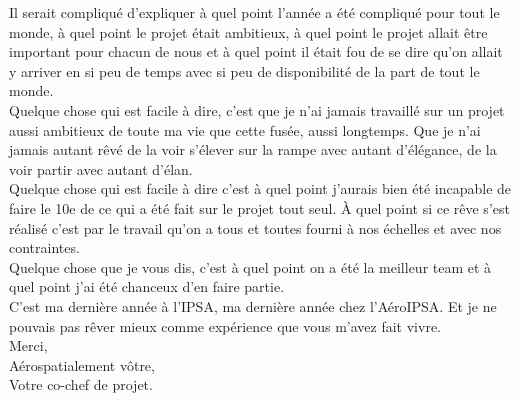 \documentclass{article}
\begin{document}
Il serait compliqué d'expliquer à quel point l'année a été compliqué pour tout le monde, à quel point le projet était
ambitieux, à quel point le projet allait être important pour chacun de nous et à quel point il était fou de se dire qu'on
allait y arriver en si peu de temps avec si peu de disponibilité de la part de tout le monde.\\

Quelque chose qui est facile à dire, c'est que je n'ai jamais travaillé sur un projet aussi ambitieux de toute ma vie que
cette fusée, aussi longtemps. Que je n'ai jamais autant rêvé de la voir s'élever sur la rampe avec autant d'élégance, de la
voir partir avec autant d'élan.\\

Quelque chose qui est facile à dire c'est à quel point j'aurais bien été incapable de faire le 10e de ce qui a été fait sur
le projet tout seul. À quel point si ce rêve s'est réalisé c'est par le travail qu'on a tous et toutes fourni à nos échelles
et avec nos contraintes.\\

Quelque chose que je vous dis, c'est à quel point on a été la meilleur team et à quel point j'ai été chanceux d'en faire
partie.\\

C'est ma dernière année à l'IPSA, ma dernière année chez l'AéroIPSA. Et je ne pouvais pas rêver mieux comme expérience que
vous m'avez fait vivre.\\

Merci,\\

Aérospatialement vôtre,\\

Votre co-chef de projet.
\end{document}
